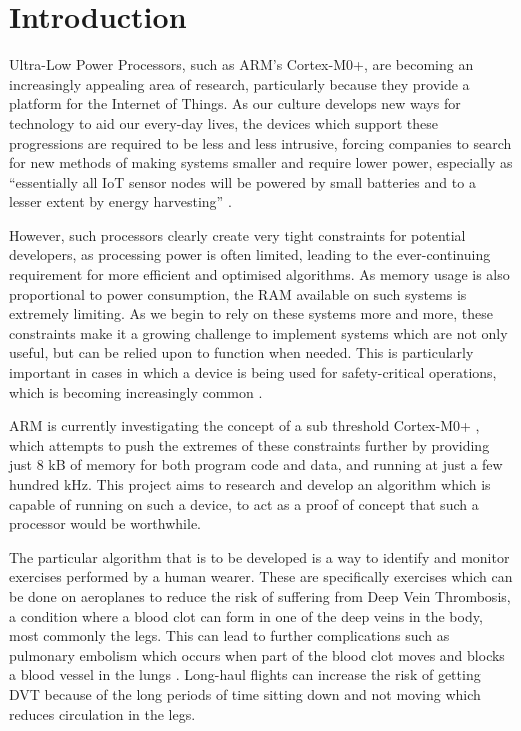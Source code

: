 \chapter{Introduction}

Ultra-Low Power Processors, such as ARM’s Cortex-M0+, are becoming an increasingly appealing area of research, particularly because they provide a platform for the Internet of Things. As our culture develops new ways for technology to aid our every-day lives, the devices which support these progressions are required to be less and less intrusive, forcing companies to search for new methods of making systems smaller and require lower power, especially as ``essentially all IoT sensor nodes will be powered by small batteries and to a lesser extent by energy harvesting'' \cite{iot_power}.

However, such processors clearly create very tight constraints for potential developers, as processing power is often limited, leading to the ever-continuing requirement for more eﬃcient and optimised algorithms. As memory usage is also proportional to power consumption, the RAM available on such systems is extremely limiting. As we begin to rely on these systems more and more, these constraints make it a growing challenge to implement systems which are not only useful, but can be relied upon to function when needed. This is particularly important in cases in which a device is being used for safety-critical operations, which is becoming increasingly common \cite{iot_saftey} \cite{iot_saftey2}.

ARM is currently investigating the concept of a sub threshold Cortex-M0+ \cite{arm_sub}, which attempts to push the extremes of these constraints further by providing just 8 kB of memory for both program code and data, and running at just a few hundred kHz. This project aims to research and develop an algorithm which is capable of running on such a device, to act as a proof of concept that such a processor would be worthwhile.


The particular algorithm that is to be developed is a way to identify and monitor exercises performed by a human wearer. These are speciﬁcally exercises which can be done on aeroplanes to reduce the risk of suﬀering from Deep Vein Thrombosis, a condition where a blood clot can form in one of the deep veins in the body, most commonly the legs. This can lead to further complications such as pulmonary embolism which occurs when part of the blood clot moves and blocks a blood vessel in the lungs \cite{dvt}. Long-haul ﬂights can increase the risk of getting DVT because of the long periods of time sitting down and not moving which reduces circulation in the legs.

